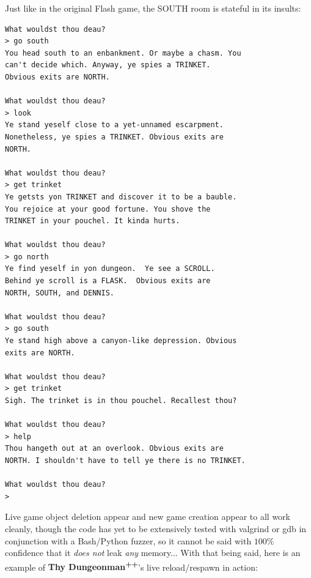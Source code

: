 \documentclass[man,12pt]{apa6}
\begin{document}
Just like in the original Flash game, the \textsf{SOUTH} room is stateful in its
insults:

\begin{singlespace}
\begin{framed}
\begin{verbatim}What wouldst thou deau?
> go south
You head south to an enbankment. Or maybe a chasm. You
can't decide which. Anyway, ye spies a TRINKET.
Obvious exits are NORTH.

What wouldst thou deau?
> look
Ye stand yeself close to a yet-unnamed escarpment.
Nonetheless, ye spies a TRINKET. Obvious exits are
NORTH.

What wouldst thou deau?
> get trinket
Ye getsts yon TRINKET and discover it to be a bauble.
You rejoice at your good fortune. You shove the
TRINKET in your pouchel. It kinda hurts.

What wouldst thou deau?
> go north
Ye find yeself in yon dungeon.  Ye see a SCROLL.
Behind ye scroll is a FLASK.  Obvious exits are
NORTH, SOUTH, and DENNIS.

What wouldst thou deau?
> go south
Ye stand high above a canyon-like depression. Obvious
exits are NORTH.

What wouldst thou deau?
> get trinket
Sigh. The trinket is in thou pouchel. Recallest thou?

What wouldst thou deau?
> help
Thou hangeth out at an overlook. Obvious exits are
NORTH. I shouldn't have to tell ye there is no TRINKET.

What wouldst thou deau?
>
\end{verbatim}
\end{framed}
\end{singlespace}

Live game object deletion appear and new game creation appear to all work
cleanly, though the code has yet to be extensively tested with \textsf{valgrind}
or \textsf{gdb} in conjunction with a Bash/Python fuzzer, so it cannot be said
with $100\%$ confidence that it \emph{does not} leak \emph{any} memory...
With that being said, here is an example of
\textbf{Thy Dungeonman\textsuperscript{++}}'s live reload/respawn in action:
\end{document}
